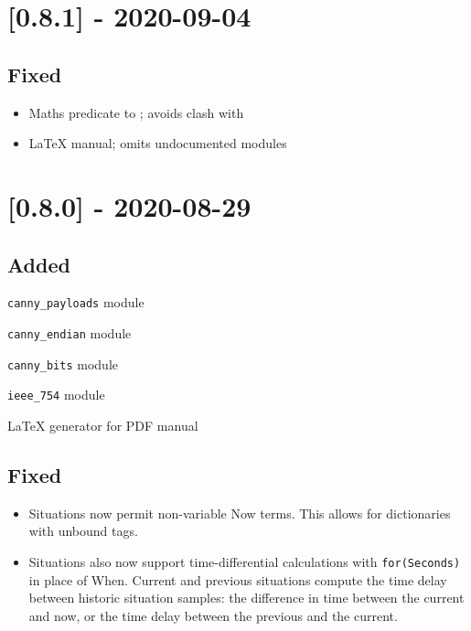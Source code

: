 \section{[0.8.1] - 2020-09-04}

\subsection{Fixed}

\begin{itemize}
    \item Maths predicate  to ; avoids clash with 
    \item LaTeX manual; omits undocumented modules
\end{itemize}

\section{[0.8.0] - 2020-08-29}

\subsection{Added}

\begin{shortlist}
    \item \verb$canny_payloads$ module
    \item \verb$canny_endian$ module
    \item \verb$canny_bits$ module
    \item \verb$ieee_754$ module
    \item LaTeX generator for PDF manual
\end{shortlist}

\subsection{Fixed}

\begin{itemize}
    \item Situations now permit non-variable Now terms. This allows for dictionaries
with unbound tags.
    \item Situations also now support time-differential calculations with \verb$for(Seconds)$
in place of When. Current and previous situations compute the time delay
between historic situation samples: the difference in time between the current
and now, or the time delay between the previous and the current.
\end{itemize}

